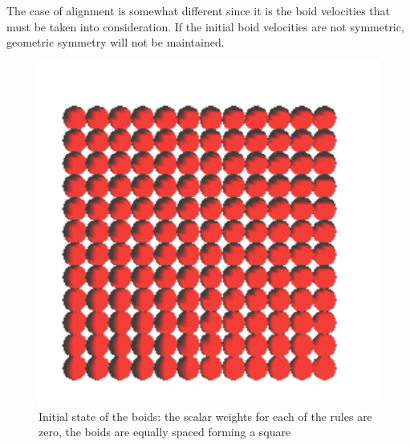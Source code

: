The case of alignment is somewhat different since it is the boid velocities that must be taken into consideration. If the initial boid velocities are not symmetric, geometric symmetry will not be maintained. 

\begin{figure}[htbp]
\begin{center}
\includegraphics[scale=0.5]{figures/align.pdf}
\caption{Initial state of the boids: the scalar weights for each of the rules are zero, the boids are equally spaced forming a square}
\label{alignRule}
\end{center}
\end{figure}


